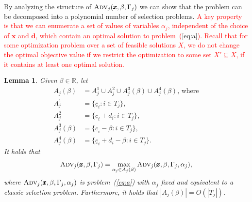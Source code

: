 \documentclass[a4paper,11pt,abstracton]{scrartcl}
\newtheorem{lem}{Lemma}%
\theoremstyle{definition}
\theoremstyle{remark}
\newcommand{\rr}{\mathbb{R}}
\begin{document}
By analyzing the structure of $\textsc{Adv}_j(\pmb{x},\beta,\Gamma_j)$ we can show 
that the problem can be decomposed into a polynomial number of selection problems. 
\textcolor{red}{A key property is that we can enumerate a set of values of variables $\alpha_j$, independent of the choice of $\pmb{x}$ and $\pmb{d}$, which contain an optimal solution to problem~(\ref{eq:a}). Recall that for some optimization problem over a set of feasible solutions $X$, we do not change the optimal objective value if we restrict the optimization to some set $X'\subseteq X$, if it contains at least one optimal solution.}
\begin{lem}
\label{lemma:alpha_j_discrete}
  Given $\beta \in \rr$, let
  \begin{align*}
    A_j(\beta) &= A^1_j \cup A^2_j \cup A^3_j(\beta) \cup A^4_j(\beta) \text{, where}  \\
    A^1_j &= \{ \underline{c}_i : i\in T_j \}, \\
    A^2_j &= \{  \underline{c}_i + d_i  : i \in T_j \},  \\
    A^3_j(\beta) &= \{\underline{c}_i - \beta : i\in T_j\}, \\
    A^4_j(\beta) &= \{\underline{c}_i +d_i - \beta : i \in T_j \}.
    \end{align*}
  It holds that 
  \[ \textsc{Adv}_j(\pmb{x},\beta,\Gamma_j) = \max_{\alpha_j \in A_j(\beta)} \textsc{Adv}_j(\pmb{x},\beta,\Gamma_j,\alpha_j), \]
  where $\textsc{Adv}_j(\pmb{x},\beta,\Gamma_j,\alpha_j)$ is problem~(\ref{eq:a}) with $\alpha_j$ fixed and 
  equivalent to a classic selection problem. Furthermore, it holds that $|A_j(\beta)| = O(|T_j|)$.
\end{lem}
\end{document}

